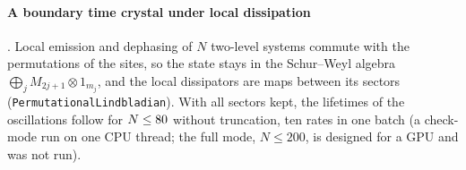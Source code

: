 \paragraph{A boundary time crystal under local dissipation}\label{sec:btc} \cite{nn_btc}. Local emission and dephasing of
$N$ two-level systems commute with the permutations of the sites, so the state stays in the Schur--Weyl algebra
$\bigoplus_jM_{2j+1}\otimes1_{m_j}$, and the local dissipators are maps between its sectors
(\texttt{PermutationalLindbladian}). With all sectors kept, the lifetimes of the oscillations follow for
$N\le\IfFileExists{generated/permutational.tex}{\PMNmax}{80}$ without truncation, ten rates in one batch (a check-mode
run on one CPU thread; the full mode, $N\le200$, is designed for a GPU and was not run).
